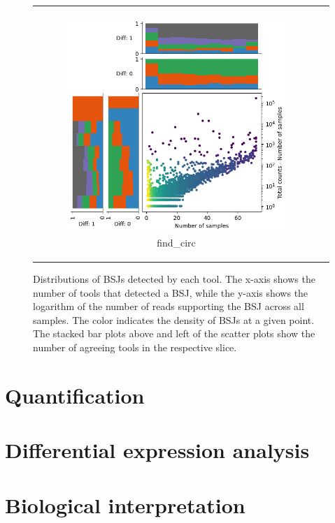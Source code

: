 \begin{figure}[ht]
\begin{tabular}{cc}
\begin{subfigure}{.5\textwidth}
            \includegraphics[width=\linewidth]{chapters/4_results_and_discussion/figures/detection/min_samples_0/density/find_circ.png}
            \caption{find\_circ}
            \label{fig:detection_density_find-circ}
        \end{subfigure}
    \end{tabular}
    \caption{Distributions of BSJs detected by each tool.
        The x-axis shows the number of tools that detected a BSJ, while the y-axis
        shows the logarithm of the number of reads supporting the BSJ across all
        samples.
        The color indicates the density of BSJs at a given point.
        The stacked bar plots above and left of the scatter plots show the number of
        agreeing tools in the respective slice.
    }
    \label{fig:detection_density}
\end{figure}

\section{Quantification}

\section{Differential expression analysis}

\section{Biological interpretation}
